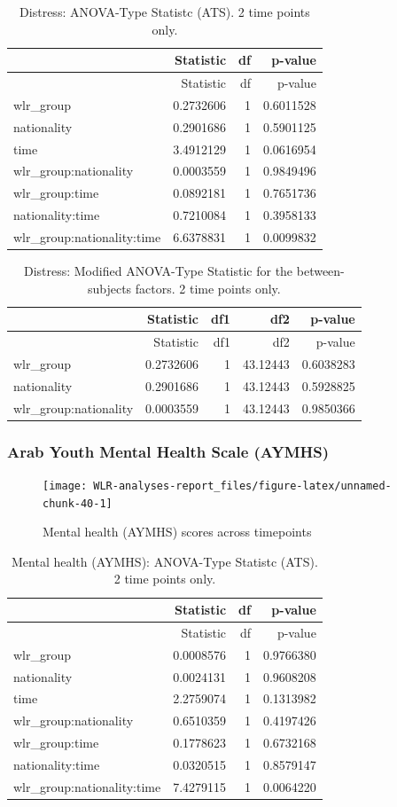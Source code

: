\documentclass[]{article}
\begin{document}
\begin{longtable}[]{@{}lrrr@{}}
\caption{Distress: ANOVA-Type Statistc (ATS). 2 time points
only.}\tabularnewline
\toprule
& Statistic & df & p-value\tabularnewline
\midrule
\endfirsthead
\toprule
& Statistic & df & p-value\tabularnewline
\midrule
\endhead
wlr\_group & 0.2732606 & 1 & 0.6011528\tabularnewline
nationality & 0.2901686 & 1 & 0.5901125\tabularnewline
time & 3.4912129 & 1 & 0.0616954\tabularnewline
wlr\_group:nationality & 0.0003559 & 1 & 0.9849496\tabularnewline
wlr\_group:time & 0.0892181 & 1 & 0.7651736\tabularnewline
nationality:time & 0.7210084 & 1 & 0.3958133\tabularnewline
wlr\_group:nationality:time & 6.6378831 & 1 & 0.0099832\tabularnewline
\bottomrule
\end{longtable}

\begin{longtable}[]{@{}lrrrr@{}}
\caption{Distress: Modified ANOVA-Type Statistic for the
between-subjects factors. 2 time points only.}\tabularnewline
\toprule
& Statistic & df1 & df2 & p-value\tabularnewline
\midrule
\endfirsthead
\toprule
& Statistic & df1 & df2 & p-value\tabularnewline
\midrule
\endhead
wlr\_group & 0.2732606 & 1 & 43.12443 & 0.6038283\tabularnewline
nationality & 0.2901686 & 1 & 43.12443 & 0.5928825\tabularnewline
wlr\_group:nationality & 0.0003559 & 1 & 43.12443 &
0.9850366\tabularnewline
\bottomrule
\end{longtable}

\newpage

\hypertarget{arab-youth-mental-health-scale-aymhs-1}{%
\subsubsection{Arab Youth Mental Health Scale
(AYMHS)}\label{arab-youth-mental-health-scale-aymhs-1}}

\begin{figure}[H]

{\centering \texttt{[image: WLR-analyses-report\_files/figure-latex/unnamed-chunk-40-1]} 

}

\caption{Mental health (AYMHS) scores across timepoints}\label{fig:unnamed-chunk-40}
\end{figure}

\begin{longtable}[]{@{}lrrr@{}}
\caption{Mental health (AYMHS): ANOVA-Type Statistc (ATS). 2 time points
only.}\tabularnewline
\toprule
& Statistic & df & p-value\tabularnewline
\midrule
\endfirsthead
\toprule
& Statistic & df & p-value\tabularnewline
\midrule
\endhead
wlr\_group & 0.0008576 & 1 & 0.9766380\tabularnewline
nationality & 0.0024131 & 1 & 0.9608208\tabularnewline
time & 2.2759074 & 1 & 0.1313982\tabularnewline
wlr\_group:nationality & 0.6510359 & 1 & 0.4197426\tabularnewline
wlr\_group:time & 0.1778623 & 1 & 0.6732168\tabularnewline
nationality:time & 0.0320515 & 1 & 0.8579147\tabularnewline
wlr\_group:nationality:time & 7.4279115 & 1 & 0.0064220\tabularnewline
\bottomrule
\end{longtable}
\end{document}
